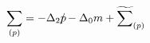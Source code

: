 \begin{equation}
\sum_{(p)}=-\Delta_{2}p\hspace{-0.2cm}/-\Delta_{0}m+\widetilde{\sum}_{(p)}
\end{equation}

